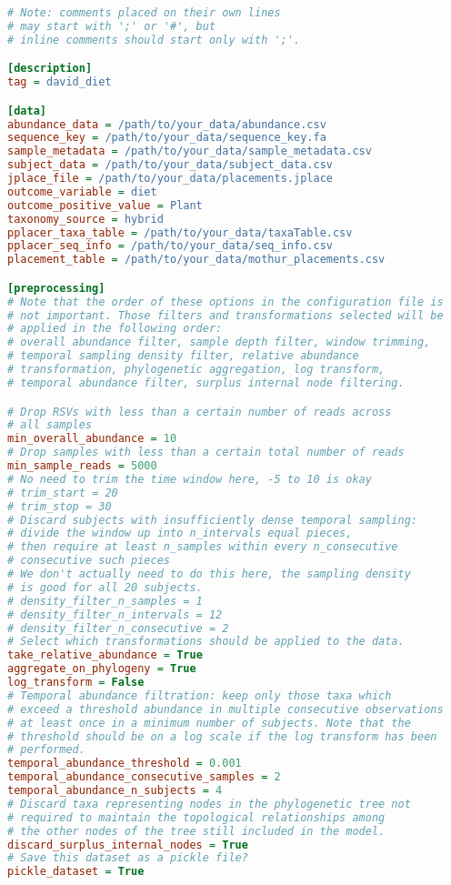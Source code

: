 \documentclass[12pt]{report}
\begin{document}
\begin{lstlisting}[language=Ini,caption=Template MITRE configuration file,numbers=none]
# Note: comments placed on their own lines
# may start with ';' or '#', but 
# inline comments should start only with ';'.

[description]
tag = david_diet

[data]
abundance_data = /path/to/your_data/abundance.csv
sequence_key = /path/to/your_data/sequence_key.fa
sample_metadata = /path/to/your_data/sample_metadata.csv
subject_data = /path/to/your_data/subject_data.csv
jplace_file = /path/to/your_data/placements.jplace
outcome_variable = diet
outcome_positive_value = Plant
taxonomy_source = hybrid
pplacer_taxa_table = /path/to/your_data/taxaTable.csv 
pplacer_seq_info = /path/to/your_data/seq_info.csv
placement_table = /path/to/your_data/mothur_placements.csv

[preprocessing]
# Note that the order of these options in the configuration file is
# not important. Those filters and transformations selected will be
# applied in the following order: 
# overall abundance filter, sample depth filter, window trimming,
# temporal sampling density filter, relative abundance
# transformation, phylogenetic aggregation, log transform,
# temporal abundance filter, surplus internal node filtering.

# Drop RSVs with less than a certain number of reads across
# all samples
min_overall_abundance = 10
# Drop samples with less than a certain total number of reads
min_sample_reads = 5000
# No need to trim the time window here, -5 to 10 is okay
# trim_start = 20
# trim_stop = 30
# Discard subjects with insufficiently dense temporal sampling:
# divide the window up into n_intervals equal pieces, 
# then require at least n_samples within every n_consecutive
# consecutive such pieces
# We don't actually need to do this here, the sampling density
# is good for all 20 subjects.
# density_filter_n_samples = 1
# density_filter_n_intervals = 12
# density_filter_n_consecutive = 2
# Select which transformations should be applied to the data. 
take_relative_abundance = True
aggregate_on_phylogeny = True
log_transform = False
# Temporal abundance filtration: keep only those taxa which 
# exceed a threshold abundance in multiple consecutive observations
# at least once in a minimum number of subjects. Note that the 
# threshold should be on a log scale if the log transform has been 
# performed.
temporal_abundance_threshold = 0.001
temporal_abundance_consecutive_samples = 2
temporal_abundance_n_subjects = 4
# Discard taxa representing nodes in the phylogenetic tree not
# required to maintain the topological relationships among
# the other nodes of the tree still included in the model.
discard_surplus_internal_nodes = True
# Save this dataset as a pickle file?
pickle_dataset = True


\end{lstlisting}
\end{document}

